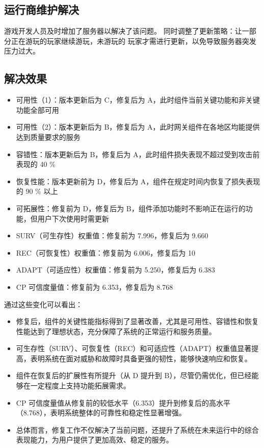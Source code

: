 \documentclass[14pt,a4paper,UTF8,twoside]{article}
\begin{document}
\subsection{运行商维护解决}

游戏开发人员及时增加了服务器以解决了该问题。
同时调整了更新策略：让一部分正在游玩的玩家继续游玩，未游玩的
玩家才需进行更新，以免导致服务器突发压力过大。

\subsection{解决效果}

\begin{itemize}
    \item 可用性（1）：版本更新后为 C，修复后为 A，此时组件当前关键功能和非关键功能全部可用
    \item 可用性（2）：版本更新后为 B，修复后为 A，此时网关组件在各地区均能提供达到质量要求的服务
    \item 容错性：版本更新后为 B，修复后为 A，此时组件损失表现不超过受到攻击前表现的 40 \%
    \item 恢复性能：版本更新前为 D，修复后为 A，组件在规定时间内恢复了损失表现的 90 \% 以上
    \item 可拓展性：修复前为 D，修复后为 B，组件添加功能时不影响正在运行的功能，但用户下次使用时需更新
    \item SURV（可生存性）权重值：修复前为 7.996，修复后为 9.660
    \item REC（可恢复性）权重值：修复前为 6.006，修复后为 10
    \item ADAPT（可适应性）权重值：修复前为 5.250，修复后为 6.383
    \item CP 可信度量值：修复前为 6.353，修复后为 8.768
\end{itemize}

通过这些变化可以看出：

\begin{itemize}
    \item 修复后，组件的关键性能指标得到了显著改善，尤其是可用性、容错性和恢复性能达到了理想状态，充分保障了系统的正常运行和服务质量。
    \item 可生存性（SURV）、可恢复性（REC）和可适应性（ADAPT）权重值显著提高，表明系统在面对威胁和故障时具备更强的韧性，能够快速响应和恢复。
    \item 组件在恢复后的扩展性有所提升（从 D 提升到 B），尽管仍需优化，但已经能够在一定程度上支持功能拓展需求。
    \item CP 可信度量值从修复前的较低水平（6.353）提升到修复后的高水平（8.768），表明系统整体的可靠性和稳定性显著增强。
    \item 总体而言，修复工作不仅解决了当前问题，还提升了系统在未来运行中的综合表现能力，为用户提供了更加高效、稳定的服务。
\end{itemize}
\end{document}
